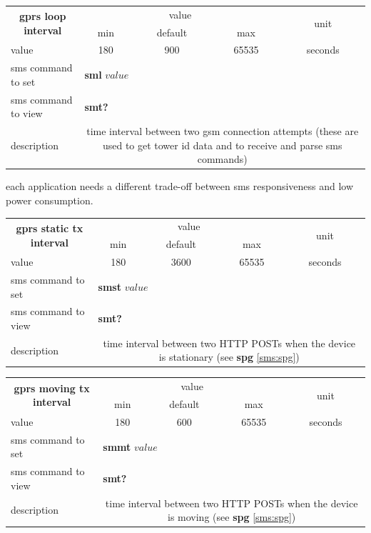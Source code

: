 \documentclass[a4paper,twoside]{refart}
\begin{document}
\label{sms:sml}
\begin{tabular}{ |l|c|c|c|c| }
    \hline
    \multicolumn{1}{|c|}{\multirow{2}{*}{\textbf{gprs loop interval}}} & \multicolumn{3}{|c|}{value} & \multicolumn{1}{|c|}{\multirow{2}{*}{unit}} \\ \cline{2-4}
    \multicolumn{1}{|c|}{} & min & default & max & \\ \hline
    value & 180 & 900 & 65535 & seconds \\ \hline
    sms command to set & \multicolumn{4}{|l|}{\textbf{sml} $value$} \\ \hline
    sms command to view & \multicolumn{4}{|l|}{\textbf{smt?}} \\ \hline
    description & \multicolumn{4}{|p{7cm}|}{time interval between two gsm connection attempts (these are used to get tower id data and to receive and parse sms commands)} \\ \hline
\end{tabular}

each application needs a different trade-off between sms responsiveness and low power consumption.

\label{sms:smst}
\begin{tabular}{ |l|c|c|c|c| }
    \hline
    \multicolumn{1}{|c|}{\multirow{2}{*}{\textbf{gprs static tx interval}}} & \multicolumn{3}{|c|}{value} & \multicolumn{1}{|c|}{\multirow{2}{*}{unit}} \\ \cline{2-4}
    \multicolumn{1}{|c|}{} & min & default & max & \\ \hline
    value & 180 & 3600 & 65535 & seconds \\ \hline
    sms command to set & \multicolumn{4}{|l|}{\textbf{smst} $value$} \\ \hline
    sms command to view & \multicolumn{4}{|l|}{\textbf{smt?}} \\ \hline
    description & \multicolumn{4}{|p{7cm}|}{time interval between two HTTP POSTs when the device is stationary (see \textbf{spg} \ref{sms:spg})} \\ \hline
\end{tabular}

\label{sms:smmt}
\begin{tabular}{ |l|c|c|c|c| }
    \hline
    \multicolumn{1}{|c|}{\multirow{2}{*}{\textbf{gprs moving tx interval}}} & \multicolumn{3}{|c|}{value} & \multicolumn{1}{|c|}{\multirow{2}{*}{unit}} \\ \cline{2-4}
    \multicolumn{1}{|c|}{} & min & default & max & \\ \hline
    value & 180 & 600 & 65535 & seconds \\ \hline
    sms command to set & \multicolumn{4}{|l|}{\textbf{smmt} $value$} \\ \hline
    sms command to view & \multicolumn{4}{|l|}{\textbf{smt?}} \\ \hline
    description & \multicolumn{4}{|p{7cm}|}{time interval between two HTTP POSTs when the device is moving (see \textbf{spg} \ref{sms:spg})} \\ \hline
\end{tabular}
\end{document}
